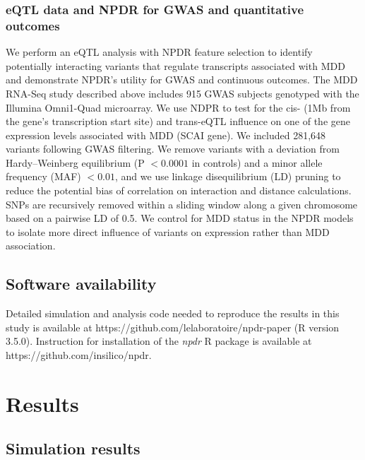 \documentclass[10pt]{article}
\begin{document}
\subsubsection{eQTL data and NPDR for GWAS and quantitative outcomes}
We perform an eQTL analysis with NPDR feature selection to identify potentially interacting variants that regulate transcripts associated with MDD and demonstrate NPDR's utility for GWAS and continuous outcomes.
The MDD RNA-Seq study described above includes 915 GWAS subjects genotyped with the Illumina Omni1-Quad microarray\cite{mostafavi14}.
We use NDPR to test for the cis- (1Mb from the gene's transcription start site) and trans-eQTL influence on one of the gene expression levels associated with MDD (SCAI gene).
We included 281,648 variants following GWAS filtering.
We remove variants with a deviation from Hardy–Weinberg equilibrium (P $<0.0001$ in controls) and a minor allele frequency (MAF) $<0.01$, and we use linkage disequilibrium (LD) pruning to reduce the potential bias of correlation on interaction and distance calculations.
SNPs are recursively removed within a sliding window along a given chromosome based on a pairwise LD of 0.5.
We control for MDD status in the NPDR models to isolate more direct influence of variants on expression rather than MDD association. 


\subsection{Software availability}
Detailed simulation and analysis code needed to reproduce the results in this study is available at {{https://github.com/lelaboratoire/npdr-paper}} (R version 3.5.0).
Instruction for installation of the \emph{npdr} R package is available at {{https://github.com/insilico/npdr}}.


\section{Results}
\subsection{Simulation results} 
\end{document}
